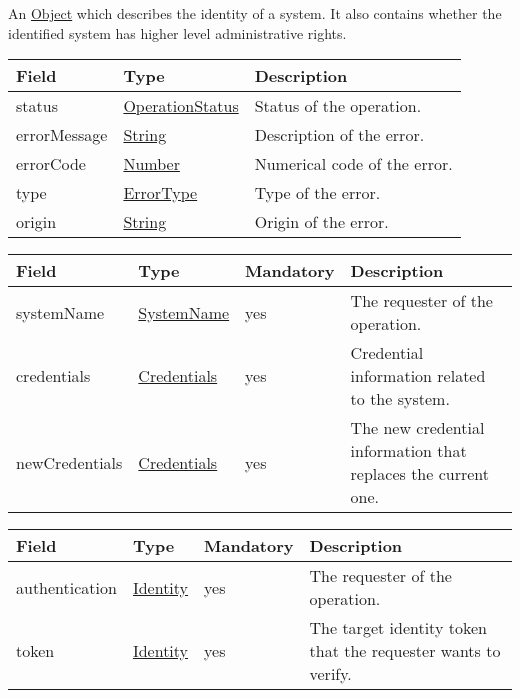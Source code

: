\documentclass[a4paper]{arrowhead}
\newcommand{\pref}[1]{{\textcolor{ArrowheadGrey}{\hyperref[sec:model:primitives:#1]{#1}}}}
\begin{document}

An \pref{Object} which describes the identity of a system. It also contains whether the identified system has higher level administrative rights.


\begin{table}[ht!]
\begin{tabularx}{\textwidth}{| p{4.25cm} | p{3.5cm} | X |} \hline
\rowcolor{gray!33} Field & Type      & Description \\ \hline
status & \pref{OperationStatus} & Status of the operation. \\ \hline
errorMessage & \pref{String} & Description of the error. \\ \hline
errorCode &\pref{Number}  & Numerical code of the error. \\ \hline
type & \pref{ErrorType} & Type of the error. \\ \hline
origin & \pref{String} & Origin of the error. \\ \hline
\end{tabularx}
\end{table}


\begin{table}[ht!]
\begin{tabularx}{\textwidth}{| p{3cm} | p{3cm} | p{2cm} | X |} \hline
\rowcolor{gray!33} Field & Type & Mandatory & Description \\ \hline
systemName & \pref{SystemName} & yes & The requester of the operation. \\ \hline
credentials & \hyperref[sec:model:Credentials]{Credentials} & yes & Credential information related to the system. \\ \hline
newCredentials &\hyperref[sec:model:Credentials]{Credentials} & yes & The new credential information that replaces the current one. \\ \hline
\end{tabularx}
\end{table}


\begin{table}[ht!]
\begin{tabularx}{\textwidth}{| p{3cm} | p{3cm} | p{2cm} | X |} \hline
\rowcolor{gray!33} Field & Type & Mandatory & Description \\ \hline
authentication &\hyperref[sec:model:Identity]{Identity} & yes & The requester of the operation. \\ \hline
token &\hyperref[sec:model:Identity]{Identity} & yes & The target identity token that the requester wants to verify. \\ \hline
\end{tabularx}
\end{table}
\end{document}
